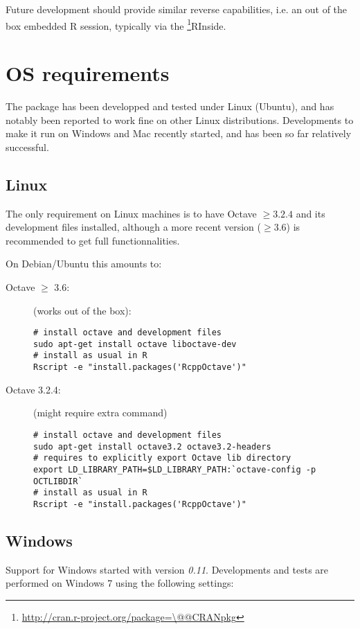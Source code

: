 \documentclass[english,10pt,a4paper]{article}\usepackage[]{graphicx}\usepackage[]{color}
\makeatletter
\newcommand{\pkgname}[1]{\textit{#1}\xspace}
\newcommand{\CRANurl}[1]{\url{http://cran.r-project.org/package=#1}}
\def\CRANpkg{\@ifstar\@CRANpkg\@@CRANpkg}
\def\@CRANpkg#1{\href{http://cran.r-project.org/package=#1}{\pkgname{#1}}\footnote{\CRANurl{#1}}}
\def\@@CRANpkg#1{\href{http://cran.r-project.org/package=#1}{\pkgname{#1}} package\footnote{\CRANurl{#1}}}
\makeatother
\begin{document}
Future development should provide similar reverse capabilities, i.e. an out
of the box embedded R session, typically via the \CRANpkg{RInside}.

\section{OS requirements}

The package has been developped and tested under Linux (Ubuntu), and has
notably been reported to work fine on other Linux distributions.
Developments to make it run on Windows and Mac recently started, and has
been so far relatively successful. 

\subsection{Linux}
The only requirement on Linux machines is to have Octave $\geq 3.2.4$
and its development files installed, although a more recent version ($\geq
3.6$) is recommended to get full functionnalities.

On Debian/Ubuntu this amounts to:

\begin{description}
  \item[Octave $\geq$ 3.6:] (works out of the box):
  
\begin{verbatim}
# install octave and development files
sudo apt-get install octave liboctave-dev
# install as usual in R
Rscript -e "install.packages('RcppOctave')"
\end{verbatim}

\item[Octave 3.2.4:] (might require extra command)
\begin{verbatim}
# install octave and development files
sudo apt-get install octave3.2 octave3.2-headers
# requires to explicitly export Octave lib directory 
export LD_LIBRARY_PATH=$LD_LIBRARY_PATH:`octave-config -p OCTLIBDIR`
# install as usual in R
Rscript -e "install.packages('RcppOctave')"
\end{verbatim}

\end{description}

\subsection{Windows}

Support for Windows started with version \emph{0.11}.
Developments and tests are performed on Windows 7 using the following
settings:
\end{document}
